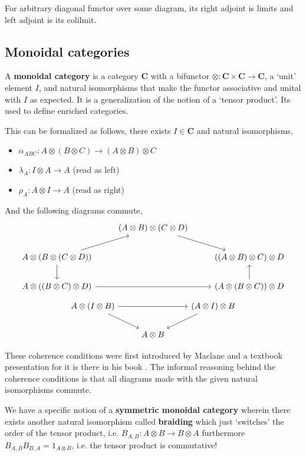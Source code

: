 \documentclass[12pt]{article}
\numberwithin{equation}{section}
\begin{document}
\begin{appendices}
		For arbitrary diagonal functor over some diagram, its right adjoint is limits and left adjoint is its colilmit.
		
		\subsection{Monoidal categories}
		A \textbf{monoidal category} is a category $\mathbf{C}$ with a bifunctor $ \otimes: \mathbf{C} \times \mathbf{C} \to \mathbf{C}$, a `unit' element $I$, and natural isomorphisms that make the functor associative and unital with $I$ as expected. It is a generalization of the notion of a `tensor product'. Its used to define enriched categories.
		
		This can be formalized as follows, there exists $I \in \mathbf{C}$ and natural isomorphisms,
		\begin{itemize}
			\item $\alpha_{ABC}: A \otimes (B \otimes C) \to (A \otimes B) \otimes C$
			\item $\lambda_A : I \otimes A \to A$ (read as left)
			\item $\rho_A: A \otimes I \to A$ (read as right)
		\end{itemize}
		
		And the following diagrams commute,
		\[\begin{tikzcd}
			& {(A\otimes B)\otimes (C \otimes D)} \\
			{A \otimes(B \otimes(C\otimes D))} && {((A\otimes B)\otimes C)\otimes D} \\
			{A \otimes ((B \otimes C) \otimes D)} && {(A \otimes (B\otimes C))\otimes D}
			\arrow[from=2-1, to=1-2]
			\arrow[from=1-2, to=2-3]
			\arrow[from=3-1, to=3-3]
			\arrow[from=3-3, to=2-3]
			\arrow[from=2-1, to=3-1]
		\end{tikzcd}\]
		\[\begin{tikzcd}
			{A\otimes(I\otimes B)} && {(A\otimes I)\otimes B} \\
			& {A\otimes B}
			\arrow[from=1-1, to=1-3]
			\arrow[from=1-3, to=2-2]
			\arrow[from=1-1, to=2-2]
		\end{tikzcd}\]
		
		These coherence conditions were first introduced by Maclane and a textbook presentation for it is there in his book \cite[Sec. ~VII Monoids]{lane1998categories}. The informal reasoning behind the coherence conditions is that all diagrams made with the given natural isomorphisms commute.
		
		We have a specific notion of a \textbf{symmetric monoidal category} wherein there exists another natural isomorphism called \textbf{braiding} which just `switches' the order of the tensor product, i.e. $B_{A,B}: A \otimes B \to B \otimes A  $ furthermore $B_{A,B}B_{B,A}=1_{A \otimes B}$, i.e. the tensor product is commutative!
		

\end{appendices}
\end{document}
